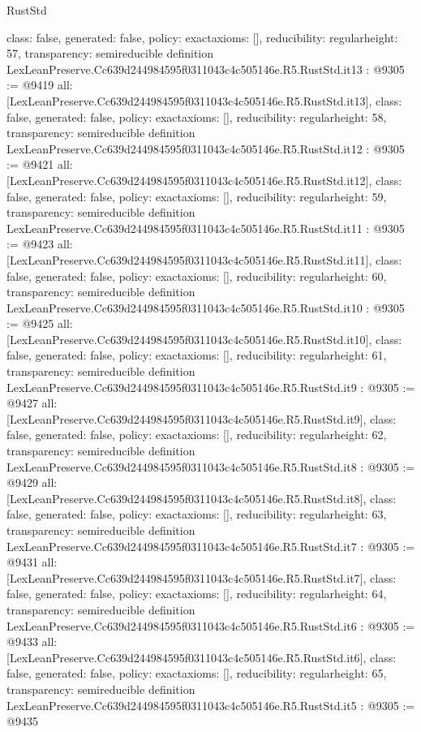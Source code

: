 \begin{lexlean}{RustStd}
\begin{coremodule}
{  class: false,
  generated: false,
  policy: exact{axioms: []},
  reducibility: regular{height: 57},
  transparency: semireducible
}
definition LexLeanPreserve.Cc639d244984595f0311043c4c505146e.R5.RustStd.it13 : @9305 := @9419 {
  all: [LexLeanPreserve.Cc639d244984595f0311043c4c505146e.R5.RustStd.it13],
  class: false,
  generated: false,
  policy: exact{axioms: []},
  reducibility: regular{height: 58},
  transparency: semireducible
}
definition LexLeanPreserve.Cc639d244984595f0311043c4c505146e.R5.RustStd.it12 : @9305 := @9421 {
  all: [LexLeanPreserve.Cc639d244984595f0311043c4c505146e.R5.RustStd.it12],
  class: false,
  generated: false,
  policy: exact{axioms: []},
  reducibility: regular{height: 59},
  transparency: semireducible
}
definition LexLeanPreserve.Cc639d244984595f0311043c4c505146e.R5.RustStd.it11 : @9305 := @9423 {
  all: [LexLeanPreserve.Cc639d244984595f0311043c4c505146e.R5.RustStd.it11],
  class: false,
  generated: false,
  policy: exact{axioms: []},
  reducibility: regular{height: 60},
  transparency: semireducible
}
definition LexLeanPreserve.Cc639d244984595f0311043c4c505146e.R5.RustStd.it10 : @9305 := @9425 {
  all: [LexLeanPreserve.Cc639d244984595f0311043c4c505146e.R5.RustStd.it10],
  class: false,
  generated: false,
  policy: exact{axioms: []},
  reducibility: regular{height: 61},
  transparency: semireducible
}
definition LexLeanPreserve.Cc639d244984595f0311043c4c505146e.R5.RustStd.it9 : @9305 := @9427 {
  all: [LexLeanPreserve.Cc639d244984595f0311043c4c505146e.R5.RustStd.it9],
  class: false,
  generated: false,
  policy: exact{axioms: []},
  reducibility: regular{height: 62},
  transparency: semireducible
}
definition LexLeanPreserve.Cc639d244984595f0311043c4c505146e.R5.RustStd.it8 : @9305 := @9429 {
  all: [LexLeanPreserve.Cc639d244984595f0311043c4c505146e.R5.RustStd.it8],
  class: false,
  generated: false,
  policy: exact{axioms: []},
  reducibility: regular{height: 63},
  transparency: semireducible
}
definition LexLeanPreserve.Cc639d244984595f0311043c4c505146e.R5.RustStd.it7 : @9305 := @9431 {
  all: [LexLeanPreserve.Cc639d244984595f0311043c4c505146e.R5.RustStd.it7],
  class: false,
  generated: false,
  policy: exact{axioms: []},
  reducibility: regular{height: 64},
  transparency: semireducible
}
definition LexLeanPreserve.Cc639d244984595f0311043c4c505146e.R5.RustStd.it6 : @9305 := @9433 {
  all: [LexLeanPreserve.Cc639d244984595f0311043c4c505146e.R5.RustStd.it6],
  class: false,
  generated: false,
  policy: exact{axioms: []},
  reducibility: regular{height: 65},
  transparency: semireducible
}
definition LexLeanPreserve.Cc639d244984595f0311043c4c505146e.R5.RustStd.it5 : @9305 := @9435 {
}
\end{coremodule}
\end{lexlean}
